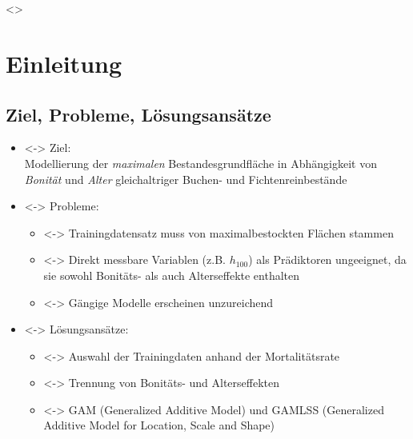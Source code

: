 
\section*{}
\begin{frame}[c]
  \only<\theFirstElement>{}
\end{frame}

\section{Einleitung}
\subsection{Ziel, Probleme, Lösungsansätze}
\begin{frame}[c]
  \begin{itemize}
  \item<\theFirstElement-> Ziel: \\
    Modellierung der \emph{maximalen} Bestandesgrundfläche in Abhängigkeit von \emph{Bonität} und \emph{Alter} gleichaltriger Buchen- und Fichtenreinbestände
  \item<\theSecondElement-> Probleme:
    \begin{itemize}
    \item<\theSecondElement-> Trainingdatensatz muss von maximalbestockten Flächen stammen
    \item<\theSecondElement-> Direkt messbare Variablen (z.B. \(h_{100}\)) als Prädiktoren ungeeignet, da sie sowohl Bonitäts- als auch Alterseffekte enthalten
    \item<\theSecondElement-> Gängige Modelle erscheinen unzureichend
    \end{itemize}
  \end{itemize}
  \begin{itemize}
  \item<\theThirdElement-> Lösungsansätze:
    \begin{itemize}
    \item<\theThirdElement-> Auswahl der Trainingdaten anhand der Mortalitätsrate
    \item<\theThirdElement-> Trennung von Bonitäts- und Alterseffekten
    \item<\theThirdElement-> GAM (Generalized Additive Model) und GAMLSS (Generalized Additive Model for Location, Scale and Shape)
    \end{itemize}
  \end{itemize}
\end{frame}

